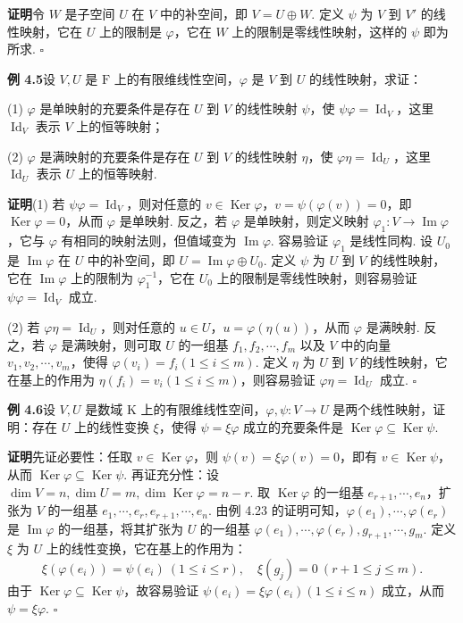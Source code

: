 \documentclass[UTF8,12pt,a4paper,fontset=fandol]{ctexart}
\begin{document}
\noindent\textbf{证明}\quad 令 $W$ 是子空间 $U$ 在 $V$ 中的补空间，即 $V=U\oplus W$. 定义 $\psi$ 为 $V$ 到 $V'$ 的线性映射，它在 $U$ 上的限制是 $\varphi$，它在 $W$ 上的限制是零线性映射，这样的 $\psi$ 即为所求. $\square$

\noindent\textbf{例 4.5}\quad 设 $V,U$ 是 $\mathrm{F}$ 上的有限维线性空间，$\varphi$ 是 $V$ 到 $U$ 的线性映射，求证：

(1) $\varphi$ 是单映射的充要条件是存在 $U$ 到 $V$ 的线性映射 $\psi$，使 $\psi\varphi=\operatorname{Id}_V$，这里 $\operatorname{Id}_V$ 表示 $V$ 上的恒等映射；

(2) $\varphi$ 是满映射的充要条件是存在 $U$ 到 $V$ 的线性映射 $\eta$，使 $\varphi\eta=\operatorname{Id}_U$，这里 $\operatorname{Id}_U$ 表示 $U$ 上的恒等映射.

\noindent\textbf{证明}\quad (1) 若 $\psi\varphi=\operatorname{Id}_V$，则对任意的 $v\in\operatorname{Ker}\varphi$，$v=\psi(\varphi(v))=0$，即 $\operatorname{Ker}\varphi=0$，从而 $\varphi$ 是单映射. 反之，若 $\varphi$ 是单映射，则定义映射 $\varphi_1:V\to\operatorname{Im}\varphi$，它与 $\varphi$ 有相同的映射法则，但值域变为 $\operatorname{Im}\varphi$. 容易验证 $\varphi_1$ 是线性同构. 设 $U_0$ 是 $\operatorname{Im}\varphi$ 在 $U$ 中的补空间，即 $U=\operatorname{Im}\varphi\oplus U_0$. 定义 $\psi$ 为 $U$ 到 $V$ 的线性映射，它在 $\operatorname{Im}\varphi$ 上的限制为 $\varphi_1^{-1}$，它在 $U_0$ 上的限制是零线性映射，则容易验证 $\psi\varphi=\operatorname{Id}_V$ 成立.

(2) 若 $\varphi\eta=\operatorname{Id}_U$，则对任意的 $u\in U$，$u=\varphi(\eta(u))$，从而 $\varphi$ 是满映射. 反之，若 $\varphi$ 是满映射，则可取 $U$ 的一组基 $f_1,f_2,\cdots,f_m$ 以及 $V$ 中的向量 $v_1,v_2,\cdots,v_m$，使得 $\varphi(v_i)=f_i(1\le i\le m)$. 定义 $\eta$ 为 $U$ 到 $V$ 的线性映射，它在基上的作用为 $\eta(f_i)=v_i(1\le i\le m)$，则容易验证 $\varphi\eta=\operatorname{Id}_U$ 成立. $\square$

\noindent\textbf{例 4.6}\quad 设 $V,U$ 是数域 $\mathrm{K}$ 上的有限维线性空间，$\varphi,\psi:V\to U$ 是两个线性映射，证明：存在 $U$ 上的线性变换 $\xi$，使得 $\psi=\xi\varphi$ 成立的充要条件是 $\operatorname{Ker}\varphi\subseteq\operatorname{Ker}\psi$.

\noindent\textbf{证明}\quad 先证必要性：任取 $v\in\operatorname{Ker}\varphi$，则 $\psi(v)=\xi\varphi(v)=0$，即有 $v\in\operatorname{Ker}\psi$，从而 $\operatorname{Ker}\varphi\subseteq\operatorname{Ker}\psi$. 再证充分性：设 $\dim V=n,\dim U=m,\dim\operatorname{Ker}\varphi=n-r$. 取 $\operatorname{Ker}\varphi$ 的一组基 $e_{r+1},\cdots,e_n$，扩张为 $V$ 的一组基 $e_1,\cdots,e_r,e_{r+1},\cdots,e_n$. 由例 4.23 的证明可知，$\varphi(e_1),\cdots,\varphi(e_r)$ 是 $\operatorname{Im}\varphi$ 的一组基，将其扩张为 $U$ 的一组基 $\varphi(e_1),\cdots,\varphi(e_r),g_{r+1},\cdots,g_m$. 定义 $\xi$ 为 $U$ 上的线性变换，它在基上的作用为：
\[
\xi(\varphi(e_i))=\psi(e_i)\ (1\le i\le r),\quad \xi(g_j)=0\ (r+1\le j\le m).
\]
由于 $\operatorname{Ker}\varphi\subseteq\operatorname{Ker}\psi$，故容易验证 $\psi(e_i)=\xi\varphi(e_i)(1\le i\le n)$ 成立，从而 $\psi=\xi\varphi$. $\square$
\end{document}
